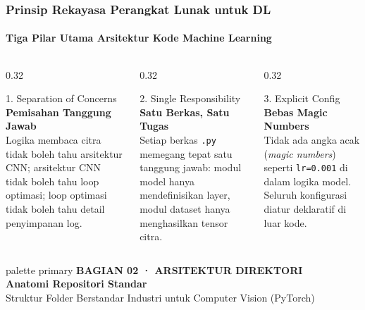 \documentclass[t,aspectratio=169,xcolor=dvipsnames]{beamer}
\begin{document}
\begin{frame}
  \frametitle{Prinsip Rekayasa Perangkat Lunak untuk DL}
  \framesubtitle{Tiga Pilar Utama Arsitektur Kode Machine Learning}

  \begin{columns}[t]
    \begin{column}{0.32\textwidth}
      \begin{block}{1. Separation of Concerns}
        \textbf{Pemisahan Tanggung Jawab}\\[0.1cm]
        \scriptsize
        Logika membaca citra tidak boleh tahu arsitektur CNN; arsitektur CNN tidak boleh tahu loop optimasi; loop optimasi tidak boleh tahu detail penyimpanan log.
      \end{block}
    \end{column}

    \begin{column}{0.32\textwidth}
      \begin{block}{2. Single Responsibility}
        \textbf{Satu Berkas, Satu Tugas}\\[0.1cm]
        \scriptsize
        Setiap berkas \texttt{.py} memegang tepat satu tanggung jawab: modul model hanya mendefinisikan layer, modul dataset hanya menghasilkan tensor citra.
      \end{block}
    \end{column}

    \begin{column}{0.32\textwidth}
      \begin{block}{3. Explicit Config}
        \textbf{Bebas Magic Numbers}\\[0.1cm]
        \scriptsize
        Tidak ada angka acak (\textit{magic numbers}) seperti \texttt{lr=0.001} di dalam logika model. Seluruh konfigurasi diatur deklaratif di luar kode.
      \end{block}
    \end{column}
  \end{columns}
\end{frame}

\begin{frame}[plain]
  \begin{beamercolorbox}[wd=\paperwidth,ht=0.96\paperheight,sep=0.8cm]{palette primary}
    \vspace{1.2cm}
    {\scriptsize\bfseries\color{dlMute}BAGIAN 02 · ARSITEKTUR DIREKTORI}\\[0.4cm]
    {\Huge\bfseries Anatomi Repositori Standar}\\[0.4cm]
    {\small\color{dlHairline}Struktur Folder Berstandar Industri untuk Computer Vision (PyTorch)}
    \vfill
  \end{beamercolorbox}
\end{frame}
\end{document}
